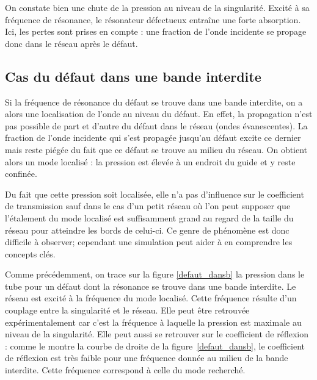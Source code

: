 \bigskip
On constate bien une chute de la pression au niveau de la singularité. Excité à sa fréquence de résonance, le résonateur défectueux entraîne une forte absorption. Ici, les pertes sont prises en compte : une fraction de l'onde incidente se propage donc dans le réseau après le défaut.



\subsection{Cas du défaut dans une bande interdite}

Si la fréquence de résonance du défaut se trouve dans une bande interdite, on a alors une localisation de l'onde au niveau du défaut. En effet, la propagation n'est pas possible de part et d'autre du défaut dans le réseau (ondes évanescentes). La fraction de l'onde incidente qui s'est propagée jusqu'au défaut excite ce dernier mais reste piégée du fait que ce défaut se trouve au milieu du réseau. On obtient alors un mode localisé : la pression est élevée à un endroit du guide et y reste confinée.
\bigskip


Du fait que cette pression soit localisée, elle n'a pas d'influence sur le coefficient de transmission sauf dans le cas d'un petit réseau où l'on peut supposer que l'étalement du mode localisé est suffisamment grand au regard de la taille du réseau pour atteindre les bords de celui-ci. Ce genre de phénomène est donc difficile à observer; cependant une simulation peut aider à en comprendre les concepts clés.
\bigskip

Comme précédemment, on trace sur la figure \ref{defaut_dansb} la pression dans le tube pour un défaut dont la résonance se trouve dans une bande interdite. Le réseau est excité à la fréquence du mode localisé. Cette fréquence résulte d'un couplage entre la singularité et le réseau. Elle peut être retrouvée expérimentalement car c'est la fréquence à laquelle la pression est maximale au niveau de la singularité. Elle peut aussi se retrouver sur le coefficient de réflexion : comme le montre la courbe de droite de la figure~\ref{defaut_dansb}, le coefficient de réflexion est très faible pour une fréquence donnée au milieu de la bande interdite. Cette fréquence correspond à celle du mode recherché.



